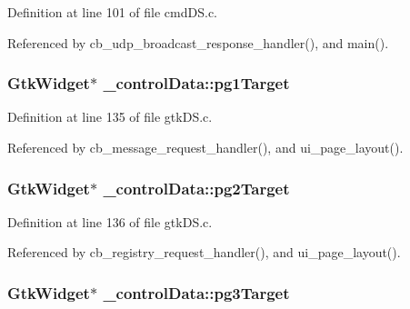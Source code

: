 Definition at line 101 of file cmd\+D\+S.\+c.



Referenced by cb\+\_\+udp\+\_\+broadcast\+\_\+response\+\_\+handler(), and main().

\subsubsection[{\texorpdfstring{pg1\+Target}{pg1Target}}]{\setlength{\rightskip}{0pt plus 5cm}Gtk\+Widget$\ast$ \+\_\+control\+Data\+::pg1\+Target}\hypertarget{struct__control_data_adb6c2830054c6309779d676082e94447}{}\label{struct__control_data_adb6c2830054c6309779d676082e94447}


Definition at line 135 of file gtk\+D\+S.\+c.



Referenced by cb\+\_\+message\+\_\+request\+\_\+handler(), and ui\+\_\+page\+\_\+layout().

\subsubsection[{\texorpdfstring{pg2\+Target}{pg2Target}}]{\setlength{\rightskip}{0pt plus 5cm}Gtk\+Widget$\ast$ \+\_\+control\+Data\+::pg2\+Target}\hypertarget{struct__control_data_a201f826ab99699df83a85c5e4572ffb2}{}\label{struct__control_data_a201f826ab99699df83a85c5e4572ffb2}


Definition at line 136 of file gtk\+D\+S.\+c.



Referenced by cb\+\_\+registry\+\_\+request\+\_\+handler(), and ui\+\_\+page\+\_\+layout().

\subsubsection[{\texorpdfstring{pg3\+Target}{pg3Target}}]{\setlength{\rightskip}{0pt plus 5cm}Gtk\+Widget$\ast$ \+\_\+control\+Data\+::pg3\+Target}\hypertarget{struct__control_data_a67d45a0e9ba1fcaabea3600dfee830b9}{}\label{struct__control_data_a67d45a0e9ba1fcaabea3600dfee830b9}


